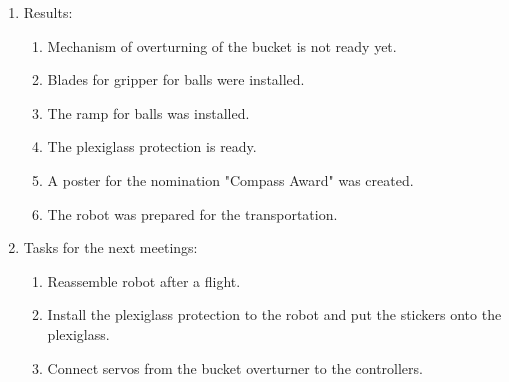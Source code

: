 \begin{enumerate}
\begin{enumerate}
	\end{enumerate}
	
	\item Results:
	\begin{enumerate}
		
		\item Mechanism of overturning of the bucket is not ready yet.
		
		\item Blades for gripper for balls were installed.
		
		\item The ramp for balls was installed.
		
		\item The plexiglass protection is ready.
		
		\item A poster for the nomination "Compass Award" was created.
		
		\item The robot was prepared for the transportation. 
		
	\end{enumerate}
	
	\item Tasks for the next meetings:
	\begin{enumerate}
		
		\item Reassemble robot after a flight.
		
		\item Install the plexiglass protection to the robot and put the stickers onto the plexiglass.
		
        \item Connect servos from the bucket overturner to the controllers.
			
	\end{enumerate}
\end{enumerate}
\fillpage
